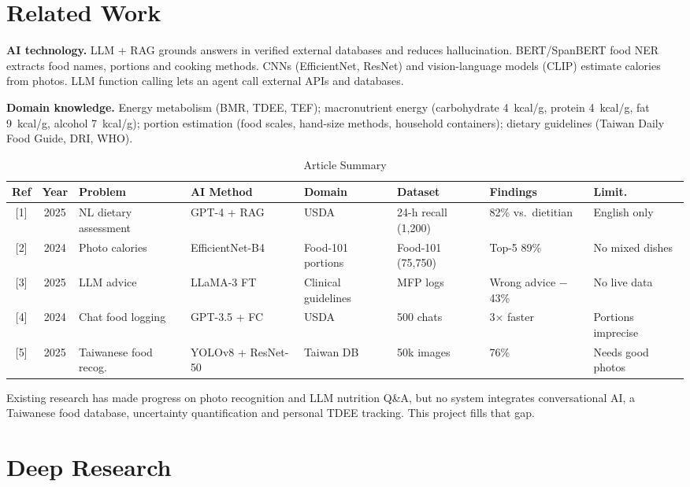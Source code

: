 \documentclass[conference]{IEEEtran}
\begin{document}
\section{Related Work}

\textbf{AI technology.} LLM + RAG grounds answers in verified external databases and reduces hallucination. BERT/SpanBERT food NER extracts food names, portions and cooking methods. CNNs (EfficientNet, ResNet) and vision-language models (CLIP) estimate calories from photos. LLM function calling lets an agent call external APIs and databases.

\textbf{Domain knowledge.} Energy metabolism (BMR, TDEE, TEF); macronutrient energy (carbohydrate 4~kcal/g, protein 4~kcal/g, fat 9~kcal/g, alcohol 7~kcal/g); portion estimation (food scales, hand-size methods, household containers); dietary guidelines (Taiwan Daily Food Guide, DRI, WHO).

\begin{table}[t]
\caption{Article Summary}
\label{tab:summary}
\centering
\scriptsize
\setlength{\tabcolsep}{2.5pt}
\begin{tabular}{@{}c c p{1.15cm} p{1.2cm} p{1.1cm} p{1.15cm} p{0.9cm} p{0.9cm}@{}}
\toprule
Ref & Year & Problem & AI Method & Domain & Dataset & Findings & Limit. \\
\midrule
{[1]} & 2025 & NL dietary assessment & GPT-4 + RAG & USDA & 24-h recall (1{,}200) & 82\% vs.\ dietitian & English only \\
{[2]} & 2024 & Photo calories & EfficientNet-B4 & Food-101 portions & Food-101 (75{,}750) & Top-5 89\% & No mixed dishes \\
{[3]} & 2025 & LLM advice & LLaMA-3 FT & Clinical guidelines & MFP logs & Wrong advice $-$43\% & No live data \\
{[4]} & 2024 & Chat food logging & GPT-3.5 + FC & USDA & 500 chats & 3$\times$ faster & Portions imprecise \\
{[5]} & 2025 & Taiwanese food recog. & YOLOv8 + ResNet-50 & Taiwan DB & 50k images & 76\% & Needs good photos \\
\bottomrule
\end{tabular}
\end{table}

Existing research has made progress on photo recognition and LLM nutrition Q\&A, but no system integrates conversational AI, a Taiwanese food database, uncertainty quantification and personal TDEE tracking. This project fills that gap.

\section{Deep Research}
\end{document}
